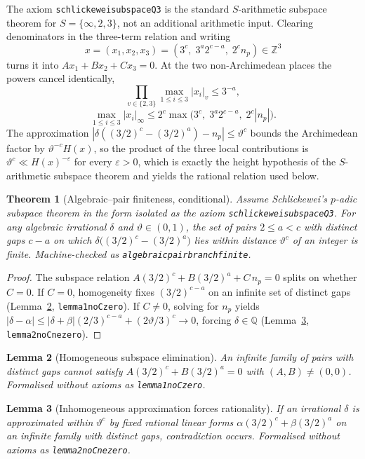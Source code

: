 \documentclass[11pt,a4paper]{article}
\newtheorem{theorem}{Theorem}[section]
\newtheorem{lemma}[theorem]{Lemma}
\theoremstyle{remark}
\newcommand{\Q}{\mathbb{Q}}
\newcommand{\Z}{\mathbb{Z}}
\renewcommand{\_}{\textunderscore\allowbreak}
\newcommand{\lean}[1]{\texttt{#1}}
\begin{document}
The axiom \lean{schlickewei\_subspace\_Q3} is the standard $S$-arithmetic subspace theorem for $S=\{\infty,2,3\}$, not an additional arithmetic input. Clearing denominators in the three-term relation and writing
\[
  x=(x_1,x_2,x_3)=(3^c,\;3^a2^{c-a},\;2^c n_p)\in\Z^3
\]
turns it into $A x_1+B x_2+C x_3=0$. At the two non-Archimedean places the powers cancel identically,
\[
  \textstyle\prod_{v\in\{2,3\}}\max_{1\le i\le3}|x_i|_v\le 3^{-a},
\]
\[
  \max_{1\le i\le3}|x_i|_\infty\le 2^c\max\bigl(3^c,\;3^a2^{c-a},\;2^c|n_p|\bigr).
\]
The approximation $|\delta((3/2)^c-(3/2)^a)-n_p|\le\vartheta^c$ bounds the Archimedean factor by $\vartheta^{-c}H(x)$, so the product of the three local contributions is $\vartheta^c\ll H(x)^{-\varepsilon}$ for every $\varepsilon>0$, which is exactly the height hypothesis of the $S$-arithmetic subspace theorem and yields the rational relation used below.

\begin{theorem}[Algebraic--pair finiteness, conditional]
\label{thm:algpair}
Assume Schlickewei's $p$-adic subspace theorem in the form isolated as the axiom \lean{schlickewei\_subspace\_Q3}. For any algebraic irrational $\delta$ and $\vartheta\in(0,1)$, the set of pairs $2\le a<c$ with distinct gaps $c-a$ on which $\delta\bigl((3/2)^c-(3/2)^a\bigr)$ lies within distance $\vartheta^c$ of an integer is finite. Machine-checked as \lean{algebraic\_pair\_branch\_finite}.
\end{theorem}

\begin{proof}
The subspace relation $A(3/2)^c+B(3/2)^a+C\,n_p=0$ splits on whether $C=0$. If $C=0$, homogeneity fixes $(3/2)^{c-a}$ on an infinite set of distinct gaps (Lemma~\ref{lem:Czero}, \lean{lemma1\_no\_C\_zero}). If $C\neq0$, solving for $n_p$ yields $|\delta-\alpha|\le |\delta+\beta|(2/3)^{c-a}+(2\vartheta/3)^c\to0$, forcing $\delta\in\Q$ (Lemma~\ref{lem:Cne}, \lean{lemma2\_no\_C\_ne\_zero}).
\end{proof}

\begin{lemma}[Homogeneous subspace elimination]
\label{lem:Czero}
An infinite family of pairs with distinct gaps cannot satisfy $A(3/2)^c+B(3/2)^a=0$ with $(A,B)\neq(0,0)$. Formalised without axioms as \lean{lemma1\_no\_C\_zero}.
\end{lemma}

\begin{lemma}[Inhomogeneous approximation forces rationality]
\label{lem:Cne}
If an irrational $\delta$ is approximated within $\vartheta^c$ by fixed rational linear forms $\alpha(3/2)^c+\beta(3/2)^a$ on an infinite family with distinct gaps, contradiction occurs. Formalised without axioms as \lean{lemma2\_no\_C\_ne\_zero}.
\end{lemma}
\end{document}
